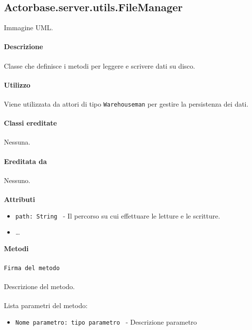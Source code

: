 \documentclass[a4paper]{article}
\begin{document}
	\subsection{Actorbase.server.utils.FileManager}
		Immagine UML.
		\\ \\
		\textbf{Descrizione}
			\\ \\
			Classe che definisce i metodi per leggere e scrivere dati su disco.
			\\ \\
		\textbf{Utilizzo}
			\\ \\
			Viene utilizzata da attori di tipo \texttt{Warehouseman} per gestire la persistenza dei dati.
			\\ \\
		\textbf{Classi ereditate}
			\\ \\
			Nessuna.
			\\ \\
		\textbf{Ereditata da}
			\\ \\
			Nessuno.
			\\ \\
		\textbf{Attributi}
			\begin{itemize}
				\item \texttt{path: String } - Il percorso su cui effettuare le letture e le scritture.
				\item \dots
			\end{itemize}
		\textbf{Metodi}
			\\ \\
			\texttt{Firma del metodo}
			\\ \\
			Descrizione del metodo.
			\\ \\
			Lista parametri del metodo:
			\begin{itemize}
				\item \texttt{Nome parametro: tipo parametro } - Descrizione parametro
			\end{itemize}
			
\end{document}
